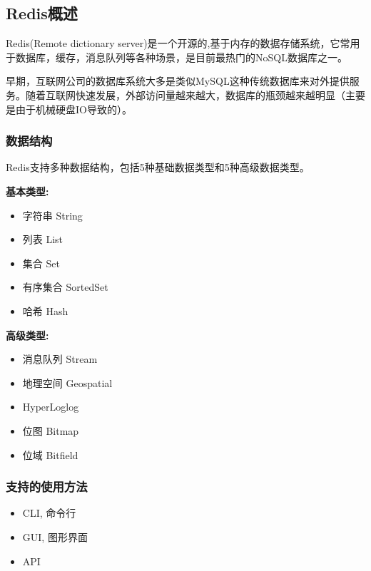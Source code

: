 
\begin{issues}
\issueDraft
\end{issues}

\subsection{Redis概述}

Redis(Remote dictionary server)是一个开源的,基于内存的数据存储系统，它常用于数据库，缓存，消息队列等各种场景，是目前最热门的NoSQL数据库之一。

早期，互联网公司的数据库系统大多是类似MySQL这种传统数据库来对外提供服务。随着互联网快速发展，外部访问量越来越大，数据库的瓶颈越来越明显（主要是由于机械硬盘IO导致的）。

\subsubsection{数据结构 }
Redis支持多种数据结构，包括5种基础数据类型和5种高级数据类型。

\textbf{基本类型:}

\begin{itemize}
\item 字符串 String
\item 列表 List
\item 集合 Set
\item 有序集合 SortedSet
\item 哈希 Hash
\end{itemize}

\textbf{高级类型:}

\begin{itemize}
\item 消息队列 Stream
\item 地理空间 Geospatial
\item HyperLoglog
\item 位图 Bitmap
\item 位域 Bitfield
\end{itemize}

\subsubsection{支持的使用方法}
\begin{itemize}
\item CLI, 命令行
\item GUI, 图形界面
\item API
\end{itemize}

